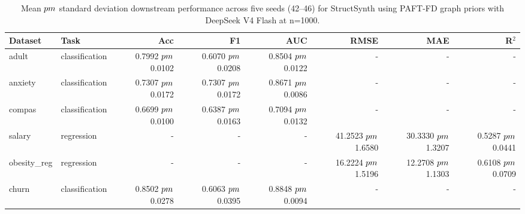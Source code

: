 \begin{table}[t]
\centering
\small
\begin{tabular}{llrrrrrr}
\toprule
Dataset & Task & Acc & F1 & AUC & RMSE & MAE & R$^2$ \\
\midrule
adult & classification & 0.7992 $\\pm$ 0.0102 & 0.6070 $\\pm$ 0.0208 & 0.8504 $\\pm$ 0.0122 & - & - & - \\
anxiety & classification & 0.7307 $\\pm$ 0.0172 & 0.7307 $\\pm$ 0.0172 & 0.8671 $\\pm$ 0.0086 & - & - & - \\
compas & classification & 0.6699 $\\pm$ 0.0100 & 0.6387 $\\pm$ 0.0163 & 0.7094 $\\pm$ 0.0132 & - & - & - \\
salary & regression & - & - & - & 41.2523 $\\pm$ 1.6580 & 30.3330 $\\pm$ 1.3207 & 0.5287 $\\pm$ 0.0441 \\
obesity\_reg & regression & - & - & - & 16.2224 $\\pm$ 1.5196 & 12.2708 $\\pm$ 1.1303 & 0.6108 $\\pm$ 0.0709 \\
churn & classification & 0.8502 $\\pm$ 0.0278 & 0.6063 $\\pm$ 0.0395 & 0.8848 $\\pm$ 0.0094 & - & - & - \\
\bottomrule
\end{tabular}
\caption{Mean $\\pm$ standard deviation downstream performance across five seeds (42--46) for StructSynth using PAFT-FD graph priors with DeepSeek V4 Flash at n=1000.}
\label{tab:paft-fd-deepseek-v4-flash}
\end{table}
